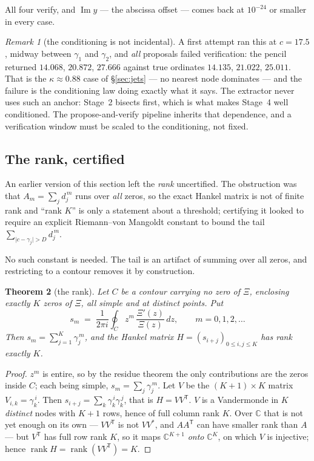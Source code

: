 \documentclass[11pt]{article}
\theoremstyle{plain}
\newtheorem{theorem}{Theorem}
\theoremstyle{definition}
\theoremstyle{remark}
\newtheorem{remark}[theorem]{Remark}
\begin{document}
\noindent
All four verify, and $\operatorname{Im}y$ --- the abscissa offset --- comes back at
$10^{-24}$ or smaller in every case.

\begin{remark}[the conditioning is not incidental]
A first attempt ran this at $c=17{.}5$, midway between $\gamma_1$ and $\gamma_2$, and
\emph{all} proposals failed verification: the pencil returned $14.068$, $20.872$,
$27.666$ against true ordinates $14.135$, $21.022$, $25.011$. That is the
$\kappa\approx0.88$ case of \S\ref{sec:jets} --- no nearest node dominates --- and the
failure is the conditioning law doing exactly what it says. The extractor never uses such
an anchor: Stage~2 bisects first, which is what makes Stage~4 well conditioned. The
propose-and-verify pipeline inherits that dependence, and a verification window must be
scaled to the conditioning, not fixed.
\end{remark}

\subsection{The rank, certified}\label{sec:rankcertified}
An earlier version of this section left the \emph{rank} uncertified. The obstruction was
that $A_m=\sum_j d_j^{\,m}$ runs over \emph{all} zeros, so the exact Hankel matrix is not
of finite rank and ``rank $K$'' is only a statement about a threshold; certifying it
looked to require an explicit Riemann--von Mangoldt constant to bound the tail
$\sum_{\lvert c-\gamma_j\rvert>D}d_j^{\,m}$.

No such constant is needed. The tail is an artifact of summing over all zeros, and
restricting to a contour removes it by construction.

\begin{theorem}[the rank]\label{thm:rankcert}
Let $C$ be a contour carrying no zero of $\Xi$, enclosing exactly $K$ zeros of $\Xi$, all
simple and at distinct points. Put
\[
  s_m\;=\;\frac{1}{2\pi i}\oint_C z^{m}\,\frac{\Xi'(z)}{\Xi(z)}\,dz ,
  \qquad m=0,1,2,\dots
\]
Then $s_m=\sum_{j=1}^{K}\gamma_j^{\,m}$, and the Hankel matrix
$H=(s_{i+j})_{0\le i,j\le K}$ has rank exactly $K$.
\end{theorem}

\begin{proof}
$z^m$ is entire, so by the residue theorem the only contributions are the zeros inside
$C$; each being simple, $s_m=\sum_j\gamma_j^{\,m}$. Let $V$ be the $(K+1)\times K$ matrix
$V_{i,k}=\gamma_k^{\,i}$. Then $s_{i+j}=\sum_k\gamma_k^{\,i}\gamma_k^{\,j}$, that is
$H=VV^{\mathsf T}$. $V$ is a Vandermonde in $K$ \emph{distinct} nodes with $K+1$ rows,
hence of full column rank $K$. Over $\mathbb C$ that is not yet enough on its own ---
$VV^{\mathsf T}$ is not $VV^{*}$, and $AA^{\mathsf T}$ can have smaller rank than $A$
--- but $V^{\mathsf T}$ has full row rank $K$, so it maps $\mathbb C^{K+1}$ \emph{onto}
$\mathbb C^{K}$, on which $V$ is injective; hence
$\operatorname{rank}H=\operatorname{rank}(VV^{\mathsf T})=K$.
\end{proof}
\end{document}

